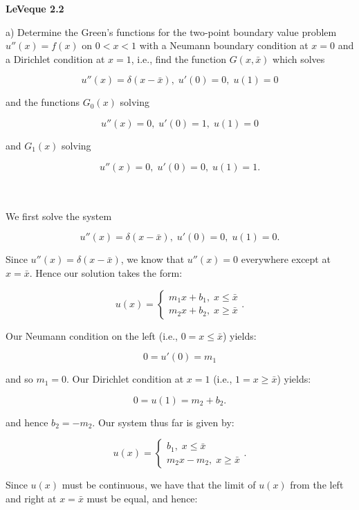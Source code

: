 \textbf{LeVeque 2.2} 

a) Determine the Green's functions for the two-point boundary value problem $u''(x) = f(x)$ on $0 < x < 1$ with a 
   Neumann boundary condition at $x = 0$ and a Dirichlet condition at $x = 1$, i.e., find the function $G(x, \bar{x})$
   which solves

    $$
        u''(x) = \delta(x - \bar{x}),\; u'(0) = 0,\; u(1) = 0
    $$

   and the functions $G_0(x)$ solving

    $$
        u''(x) = 0,\; u'(0) = 1,\; u(1) = 0
    $$

   and $G_1(x)$ solving

    $$
        u''(x) = 0,\; u'(0) = 0,\; u(1) = 1.
    $$

\begin{solution}\ \\\\
    We first solve the system 
    
    $$
        u''(x) = \delta(x - \bar{x}),\; u'(0) = 0,\; u(1) = 0.
    $$

    Since $u''(x) = \delta(x - \bar{x})$, we know that $u''(x) = 0$ everywhere except at $x = \bar{x}$. Hence our 
    solution takes the form:

    $$
    u(x) = \begin{cases}
        m_1 x + b_1, \; x \le \bar{x} \\
        m_2 x + b_2, \; x \ge \bar{x}
    \end{cases}.
    $$


    Our Neumann condition on the left (i.e., $0 = x \le \bar{x}$) yields:

    $$
    0 = u'(0) = m_1
    $$
    
    and so $m_1 = 0$. Our Dirichlet condition at $x = 1$ (i.e., $1 = x \ge \bar{x}$) yields:

    $$
    0 = u(1) = m_2 + b_2.
    $$

    and hence $b_2 = -m_2$. Our system thus far is given by:

    $$
    u(x) = \begin{cases}
        b_1, \; x \le \bar{x} \\
        m_2 x - m_2, \; x \ge \bar{x}
    \end{cases}.
    $$
   
    \pagebreak

    Since $u(x)$ must be continuous, we have that the limit of $u(x)$ from the left and right
    at $x = \bar{x}$ must be equal, and hence:


\end{solution}
